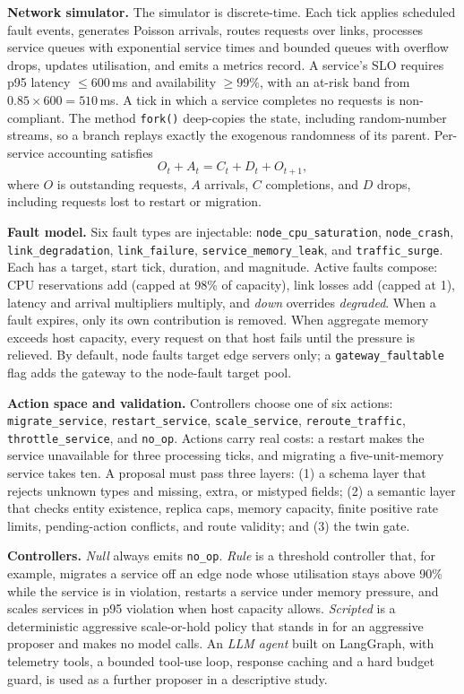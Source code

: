\documentclass[conference]{IEEEtran}
\begin{document}
\textbf{Network simulator.} The simulator is discrete-time. Each tick applies scheduled fault events, generates Poisson arrivals, routes requests over links, processes service queues with exponential service times and bounded queues with overflow drops, updates utilisation, and emits a metrics record. A service's SLO requires p95 latency $\le 600$\,ms and availability $\ge 99\%$, with an at-risk band from $0.85 \times 600 = 510$\,ms. A tick in which a service completes no requests is non-compliant. The method \texttt{fork()} deep-copies the state, including random-number streams, so a branch replays exactly the exogenous randomness of its parent. Per-service accounting satisfies
\begin{equation}
O_{t} + A_t = C_t + D_t + O_{t+1},
\label{eq:conservation}
\end{equation}
where $O$ is outstanding requests, $A$ arrivals, $C$ completions, and $D$ drops, including requests lost to restart or migration.

\textbf{Fault model.} Six fault types are injectable: \texttt{node\_cpu\_saturation}, \texttt{node\_crash}, \texttt{link\_degradation}, \texttt{link\_failure}, \texttt{service\_memory\_leak}, and \texttt{traffic\_surge}. Each has a target, start tick, duration, and magnitude. Active faults compose: CPU reservations add (capped at 98\% of capacity), link losses add (capped at 1), latency and arrival multipliers multiply, and \emph{down} overrides \emph{degraded}. When a fault expires, only its own contribution is removed. When aggregate memory exceeds host capacity, every request on that host fails until the pressure is relieved. By default, node faults target edge servers only; a \texttt{gateway\_faultable} flag adds the gateway to the node-fault target pool.

\textbf{Action space and validation.} Controllers choose one of six actions: \texttt{migrate\_service}, \texttt{restart\_service}, \texttt{scale\_service}, \texttt{reroute\_traffic}, \texttt{throttle\_service}, and \texttt{no\_op}. Actions carry real costs: a restart makes the service unavailable for three processing ticks, and migrating a five-unit-memory service takes ten. A proposal must pass three layers: (1) a schema layer that rejects unknown types and missing, extra, or mistyped fields; (2) a semantic layer that checks entity existence, replica caps, memory capacity, finite positive rate limits, pending-action conflicts, and route validity; and (3) the twin gate.

\textbf{Controllers.} \emph{Null} always emits \texttt{no\_op}. \emph{Rule} is a threshold controller that, for example, migrates a service off an edge node whose utilisation stays above 90\% while the service is in violation, restarts a service under memory pressure, and scales services in p95 violation when host capacity allows. \emph{Scripted} is a deterministic aggressive scale-or-hold policy that stands in for an aggressive proposer and makes no model calls. An \emph{LLM agent} built on LangGraph, with telemetry tools, a bounded tool-use loop, response caching and a hard budget guard, is used as a further proposer in a descriptive study.
\end{document}

